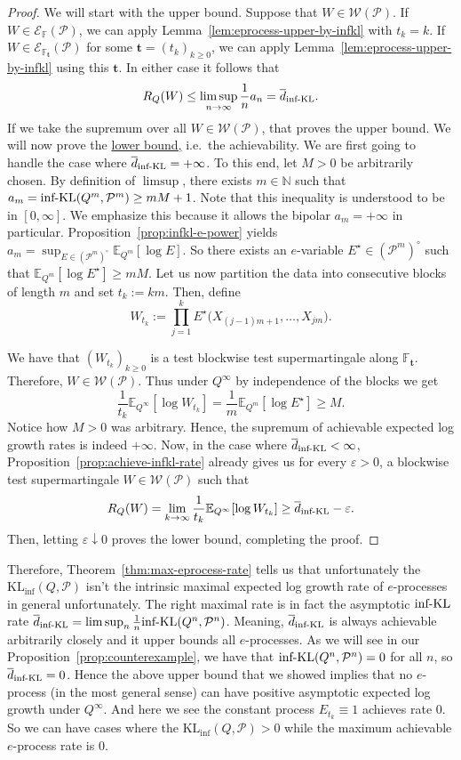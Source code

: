 \documentclass[11pt]{article}
\newcommand{\KLinf}{\mathrm{KL}_{\mathrm{inf}}}
\newcommand{\infKL}{\textnormal{inf-KL}}
\newcommand{\E}{\mathbb{E}}
\newcommand{\Pcal}{\mathcal{P}}
\newcommand{\bbF}{\mathbb F}
\newcommand{\bt}{\mathbf t}
\newcommand{\Wcal}{\mathcal W}
\theoremstyle{definition}
\theoremstyle{definition}
\begin{document}
\begin{proof}
We will start with the upper bound. Suppose that $W\in\Wcal(\Pcal)$. If $W\in\mathcal E_{\bbF}(\Pcal)$, we can apply Lemma~\ref{lem:eprocess-upper-by-infkl} with $t_k=k$. If $W\in\mathcal E_{\bbF_{\bt}}(\Pcal)$ for some $\bt=(t_k)_{k\ge 0}$, we can apply Lemma~\ref{lem:eprocess-upper-by-infkl} using this $\bt$. In either case it follows that
\[
R_Q(W)\le \limsup_{n\to\infty}\frac1n a_n = \overline d_{\infKL}.
\]
If we take the supremum over all $W\in\Wcal(\Pcal)$, that proves the upper bound. We will now prove the \underline{lower bound,} i.e.\ the achievability. We are first going to handle the case where $\overline d_{\infKL}=+\infty$. To this end, let $M>0$ be arbitrarily chosen. By definition of $\limsup$, there exists $m\in\mathbb N$ such that $a_m=\infKL(Q^m, \Pcal^m)\ge mM+1$. Note that this inequality is understood to be in $[0,\infty]$. We emphasize this because it allows the bipolar $a_m=+\infty$ in particular. Proposition~\ref{prop:infkl-e-power} yields $a_m=\sup_{E\in(\Pcal^m)^\circ}\E_{Q^m}[\log E]$. So there exists an $e$-variable $E^\star\in(\Pcal^m)^\circ$ such that $\E_{Q^m}[\log E^\star]\ge mM$. Let us now partition the data into consecutive blocks of length $m$ and set $t_k:=km$. Then, define
\[
W_{t_k}:=\prod_{j=1}^k E^\star\bigl(X_{(j-1)m+1},\dots,X_{jm}\bigr).
\]

We have that $(W_{t_k})_{k\ge 0}$ is a test blockwise test supermartingale along $\bbF_{\bt}$. Therefore, $W\in\Wcal(\Pcal)$. Thus under $Q^\infty$ by independence of the blocks we get
\[
\frac{1}{t_k}\E_{Q^\infty}[\log W_{t_k}] =\frac{1}{m}\E_{Q^m}[\log E^\star] \ge M.
\]
Notice how $M>0$ was arbitrary. Hence, the supremum of achievable expected log growth rates is indeed $+\infty$. Now, in the case where $\overline d_{\infKL}<\infty$, Proposition~\ref{prop:achieve-infkl-rate} already gives us for every $\varepsilon>0$, a blockwise test supermartingale $W\in\Wcal(\Pcal)$ such that
\[
R_Q(W)=\lim_{k\to\infty}\frac{1}{t_k}\E_{Q^\infty}[\log W_{t_k}] \ge \overline d_{\infKL}-\varepsilon.
\]
Then, letting $\varepsilon\downarrow0$ proves the lower bound, completing the proof.
\end{proof}

Therefore, Theorem~\ref{thm:max-eprocess-rate} tells us that unfortunately the $\KLinf(Q,\Pcal)$ isn't the intrinsic maximal expected log growth rate of $e$-processes in general unfortunately. The right maximal rate is in fact the asymptotic $\infKL$ rate $\overline d_{\infKL}=\limsup_n \frac1n\infKL(Q^n,\Pcal^n)$. Meaning, $\overline d_{\infKL}$ is always achievable arbitrarily closely and it upper bounds all $e$-processes. 
As we will see in our Proposition~\ref{prop:counterexample}, we have that $\infKL(Q^n, \Pcal^n)=0$ for all $n$, so $\overline d_{\infKL}=0$. Hence the above upper bound that we showed implies that no $e$-process (in the most general sense) can have positive asymptotic expected log growth under $Q^\infty$. And here we see the constant process $E_{t_k}\equiv 1$ achieves rate $0$. So we can have cases where the $\KLinf(Q,\Pcal)>0$ while the maximum achievable $e$-process rate is $0$.
\end{document}
